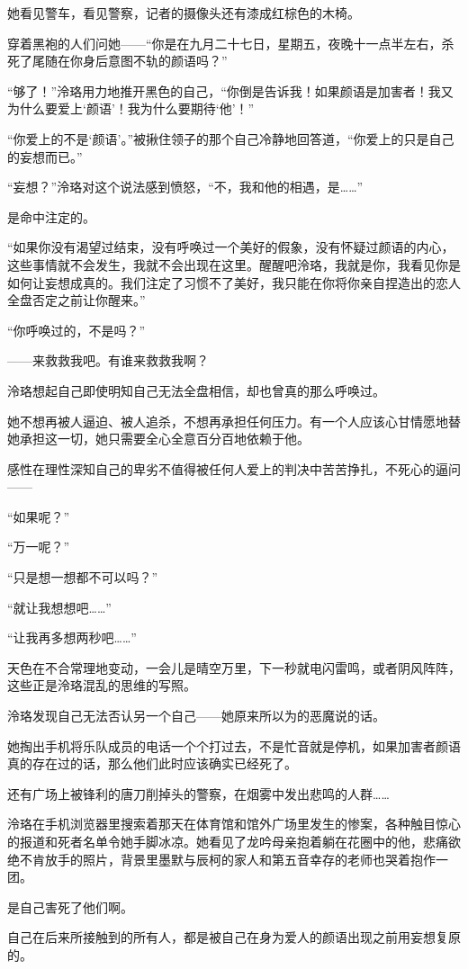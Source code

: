 \documentclass[UTF8, scheme = chinese, openany]{ctexbook}
\begin{document}
她看见警车，看见警察，记者的摄像头还有漆成红棕色的木椅。

穿着黑袍的人们问她——“你是在九月二十七日，星期五，夜晚十一点半左右，杀死了尾随在你身后意图不轨的颜语吗？”

“够了！”泠珞用力地推开黑色的自己，“你倒是告诉我！如果颜语是加害者！我又为什么要爱上‘颜语’！我为什么要期待‘他’！”

“你爱上的不是‘颜语’。”被揪住领子的那个自己冷静地回答道，“你爱上的只是自己的妄想而已。”

“妄想？”泠珞对这个说法感到愤怒，“不，我和他的相遇，是……”

是命中注定的。

“如果你没有渴望过结束，没有呼唤过一个美好的假象，没有怀疑过颜语的内心，这些事情就不会发生，我就不会出现在这里。醒醒吧泠珞，我就是你，我看见你是如何让妄想成真的。我们注定了习惯不了美好，我只能在你将你亲自捏造出的恋人全盘否定之前让你醒来。”

“你呼唤过的，不是吗？”

——来救救我吧。有谁来救救我啊？

泠珞想起自己即使明知自己无法全盘相信，却也曾真的那么呼唤过。

她不想再被人逼迫、被人追杀，不想再承担任何压力。有一个人应该心甘情愿地替她承担这一切，她只需要全心全意百分百地依赖于他。

感性在理性深知自己的卑劣不值得被任何人爱上的判决中苦苦挣扎，不死心的逼问——

“如果呢？”

“万一呢？”

“只是想一想都不可以吗？”

“就让我想想吧……”

“让我再多想两秒吧……”

天色在不合常理地变动，一会儿是晴空万里，下一秒就电闪雷鸣，或者阴风阵阵，这些正是泠珞混乱的思维的写照。

泠珞发现自己无法否认另一个自己——她原来所以为的恶魔说的话。

她掏出手机将乐队成员的电话一个个打过去，不是忙音就是停机，如果加害者颜语真的存在过的话，那么他们此时应该确实已经死了。

还有广场上被锋利的唐刀削掉头的警察，在烟雾中发出悲鸣的人群……

泠珞在手机浏览器里搜索着那天在体育馆和馆外广场里发生的惨案，各种触目惊心的报道和死者名单令她手脚冰凉。她看见了龙吟母亲抱着躺在花圈中的他，悲痛欲绝不肯放手的照片，背景里墨默与辰柯的家人和第五音幸存的老师也哭着抱作一团。

是自己害死了他们啊。

自己在后来所接触到的所有人，都是被自己在身为爱人的颜语出现之前用妄想复原的。
\end{document}
